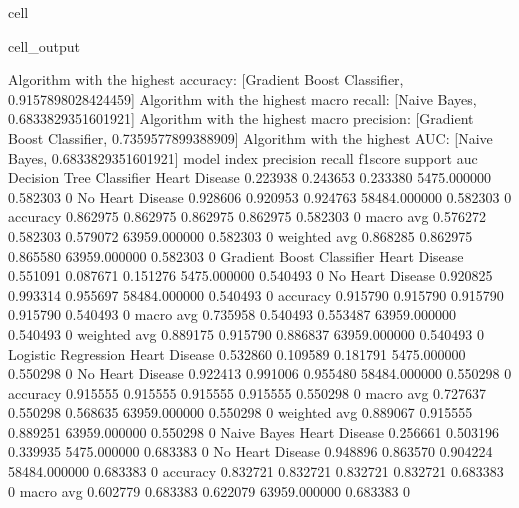 \documentclass[letterpaper,10pt,english]{jupyterBook}
\begin{document}
\begin{sphinxuseclass}{cell}
\begin{sphinxVerbatimOutput}
\begin{sphinxuseclass}{cell_output}
\begin{sphinxVerbatim}[commandchars=\\\{\}]
Algorithm with the highest accuracy: [\PYGZsq{}Gradient Boost Classifier\PYGZsq{}, 0.9157898028424459]
Algorithm with the highest macro recall:
        [\PYGZsq{}Naive Bayes\PYGZsq{}, 0.6833829351601921]
Algorithm with the highest macro precision:
        [\PYGZsq{}Gradient Boost Classifier\PYGZsq{}, 0.7359577899388909]
Algorithm with the highest AUC:
        [\PYGZsq{}Naive Bayes\PYGZsq{}, 0.6833829351601921]
model                      index             precision  recall    f1\PYGZhy{}score  support       auc     
Decision Tree Classifier   Heart Disease     0.223938   0.243653  0.233380  5475.000000   0.582303    0
                           No Heart Disease  0.928606   0.920953  0.924763  58484.000000  0.582303    0
                           accuracy          0.862975   0.862975  0.862975  0.862975      0.582303    0
                           macro avg         0.576272   0.582303  0.579072  63959.000000  0.582303    0
                           weighted avg      0.868285   0.862975  0.865580  63959.000000  0.582303    0
Gradient Boost Classifier  Heart Disease     0.551091   0.087671  0.151276  5475.000000   0.540493    0
                           No Heart Disease  0.920825   0.993314  0.955697  58484.000000  0.540493    0
                           accuracy          0.915790   0.915790  0.915790  0.915790      0.540493    0
                           macro avg         0.735958   0.540493  0.553487  63959.000000  0.540493    0
                           weighted avg      0.889175   0.915790  0.886837  63959.000000  0.540493    0
Logistic Regression        Heart Disease     0.532860   0.109589  0.181791  5475.000000   0.550298    0
                           No Heart Disease  0.922413   0.991006  0.955480  58484.000000  0.550298    0
                           accuracy          0.915555   0.915555  0.915555  0.915555      0.550298    0
                           macro avg         0.727637   0.550298  0.568635  63959.000000  0.550298    0
                           weighted avg      0.889067   0.915555  0.889251  63959.000000  0.550298    0
Naive Bayes                Heart Disease     0.256661   0.503196  0.339935  5475.000000   0.683383    0
                           No Heart Disease  0.948896   0.863570  0.904224  58484.000000  0.683383    0
                           accuracy          0.832721   0.832721  0.832721  0.832721      0.683383    0
                           macro avg         0.602779   0.683383  0.622079  63959.000000  0.683383    0

\end{sphinxVerbatim}
\end{sphinxuseclass}
\end{sphinxVerbatimOutput}
\end{sphinxuseclass}
\end{document}
